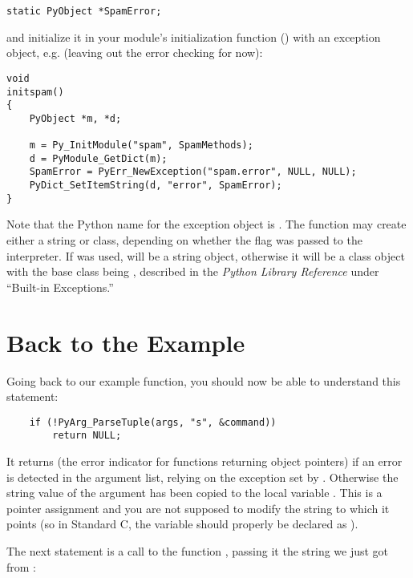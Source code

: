 \documentclass{manual}
\begin{document}
\begin{verbatim}
static PyObject *SpamError;
\end{verbatim}

and initialize it in your module's initialization function
() with an exception object, e.g. (leaving out
the error checking for now):

\begin{verbatim}
void
initspam()
{
    PyObject *m, *d;

    m = Py_InitModule("spam", SpamMethods);
    d = PyModule_GetDict(m);
    SpamError = PyErr_NewException("spam.error", NULL, NULL);
    PyDict_SetItemString(d, "error", SpamError);
}
\end{verbatim}

Note that the Python name for the exception object is
.  The  function
may create either a string or class, depending on whether the
 flag was passed to the interpreter.  If  was used,
 will be a string object, otherwise it will be a
class object with the base class being ,
described in the \emph{Python Library Reference} under ``Built-in
Exceptions.''


\section{Back to the Example
         \label{backToExample}}

Going back to our example function, you should now be able to
understand this statement:

\begin{verbatim}
    if (!PyArg_ParseTuple(args, "s", &command))
        return NULL;
\end{verbatim}

It returns \NULL{} (the error indicator for functions returning
object pointers) if an error is detected in the argument list, relying
on the exception set by .  Otherwise the
string value of the argument has been copied to the local variable
.  This is a pointer assignment and you are not supposed
to modify the string to which it points (so in Standard C, the variable
 should properly be declared as ).

The next statement is a call to the \UNIX{} function
, passing it the string we just got from
:
\end{document}
